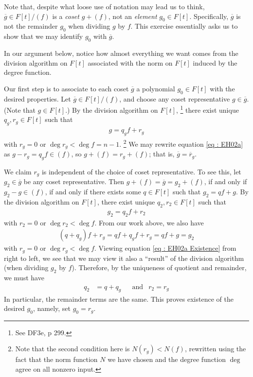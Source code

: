 \documentclass[oneside, english, 11pt]{article}
\begin{document}
Note that, despite what loose use of notation may lead us to think, $\overline{g} \in F[t] / (f)$ is a \emph{coset} $g + (f)$, not an \emph{element} $g_{0} \in F[t]$. Specifically, $\overline{g}$ is not the remainder $g_{0}$ when dividing $g$ by $f$. This exercise essentially asks us to show that we may identify $g_{0}$ with $\overline{g}$.

In our argument below, notice how almost everything we want comes from the division algorithm on $F[t]$ associated with the norm on $F[t]$ induced by the degree function.

Our first step is to associate to each coset $\overline{g}$ a polynomial $g_{0} \in F[t]$ with the desired properties. Let $\overline{g} \in F[t] / (f)$, and choose any coset representative $g \in \overline{g}$. (Note that $g \in F[t]$.) By the division algorithm on $F[t]$,%
\footnote{See DF3e, p 299.} %
there exist unique $q_{g}, r_{g} \in F[t]$ such that
\begin{align}
g
=
q_{g} f + r_{g}%
\label{eq : EH02a}
\end{align}
with $r_{g} = 0$ or $\deg r_{g} < \deg f = n - 1$.%
\footnote{Note that the second condition here is $N(r_{g}) < N(f)$, rewritten using the fact that the norm function $N$ we have chosen and the degree function $\deg$ agree on all nonzero input.} %
We may rewrite equation \eqref{eq : EH02a} as $g - r_{g} = q_{g} f \in (f)$, so $g + (f) = r_{g} + (f)$; that is, $\overline{g} = \overline{r}_{g}$.

We claim $r_{g}$ is independent of the choice of coset representative. To see this, let $g_{2} \in \overline{g}$ be any coset representative. Then $g + (f) = \overline{g} = g_{2} + (f)$, if and only if $g_{2} - g \in (f)$, if and only if there exists some $q \in F[t]$ such that $g_{2} = q f + g$. By the division algorithm on $F[t]$, there exist unique $q_{2}, r_{2} \in F[t]$ such that
\begin{align*}
g_{2}
=
q_{2} f + r_{2}
\end{align*} 
with $r_{2} = 0$ or $\deg r_{2} < \deg f$. From our work above, we also have
\begin{align}
(q + q_{g}) f + r_{g}
=
q f + q_{g} f + r_{g}
=
q f + g
=
g_{2}%
\label{eq : EH02a Existence}
\end{align}
with $r_{g} = 0$ or $\deg r_{g} < \deg f$. Viewing equation \eqref{eq : EH02a Existence} from right to left, we see that we may view it also a ``result'' of the division algorithm (when dividing $g_{2}$ by $f$). Therefore, by the uniqueness of quotient and remainder, we must have
\begin{align*}
q_{2}
&=
q + q_{g}
&
&\text{and}
&
r_{2}
=
r_{g}
\end{align*}
In particular, the remainder terms are the same. This proves existence of the desired $g_{0}$, namely, set $g_{0} = r_{g}$.
\end{document}
